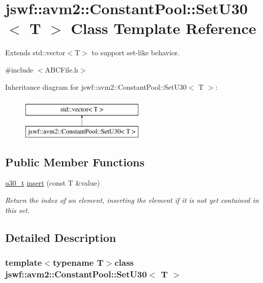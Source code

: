 \hypertarget{classjswf_1_1avm2_1_1_constant_pool_1_1_set_u30}{\section{jswf\+:\+:avm2\+:\+:Constant\+Pool\+:\+:Set\+U30$<$ T $>$ Class Template Reference}
\label{classjswf_1_1avm2_1_1_constant_pool_1_1_set_u30}
}


Extends std\+::vector$<$\+T$>$ to support set-\/like behavior.  




{\ttfamily \#include $<$A\+B\+C\+File.\+h$>$}

Inheritance diagram for jswf\+:\+:avm2\+:\+:Constant\+Pool\+:\+:Set\+U30$<$ T $>$\+:\begin{figure}[H]
\begin{center}
\leavevmode
\includegraphics[height=2.000000cm]{classjswf_1_1avm2_1_1_constant_pool_1_1_set_u30}
\end{center}
\end{figure}
\subsection*{Public Member Functions}
\begin{DoxyCompactItemize}
\item 
\hyperlink{namespacejswf_aa10d9ddca2a6a5debdc261dfae3d1117}{u30\+\_\+t} \hyperlink{classjswf_1_1avm2_1_1_constant_pool_1_1_set_u30_ae6525e0baf97636588b99079f82be514}{insert} (const T \&value)
\begin{DoxyCompactList}\small\item\em Return the index of an element, inserting the element if it is not yet contained in this set. \end{DoxyCompactList}\end{DoxyCompactItemize}


\subsection{Detailed Description}
\subsubsection*{template$<$typename T$>$class jswf\+::avm2\+::\+Constant\+Pool\+::\+Set\+U30$<$ T $>$}

